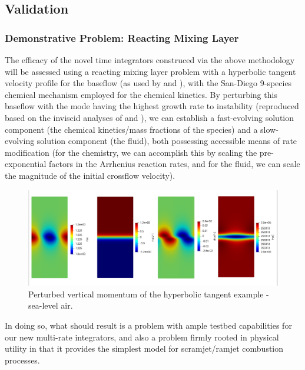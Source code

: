 \subsection{Validation}

\subsubsection{Demonstrative Problem: Reacting Mixing Layer}

The efficacy of the novel time integrators construced via the above methodology will
be assessed using a reacting mixing layer problem with a hyperbolic tangent velocity profile
for the baseflow (as used by \cite{michalke1964inviscid} and \cite{blumen1970shear}), with
the San-Diego 9-species chemical mechanism employed for the chemical kinetics. By perturbing
this baseflow with the mode having the highest growth rate to instability (reproduced based
on the inviscid analyses of \cite{michalke1964inviscid} and \cite{blumen1970shear}), we can
establish a fast-evolving solution component (the chemical kinetics/mass fractions of the
species) and a slow-evolving solution component (the fluid), both possessing accessible
means of rate modification (for the chemistry, we can accomplish this by scaling the
pre-exponential factors in the Arrhenius reaction rates, and for the fluid, we can scale
the magnitude of the initial crossflow velocity).

\begin{figure}
\centering
\includegraphics[width=0.9\linewidth,trim=4 4 4 4,clip]{figures/hyperbolic_tangent_air.png}
\caption{Perturbed vertical momentum of the hyperbolic tangent example - sea-level air.}
\label{fig:hyperbolic_cold_rhov2}
\end{figure}

In doing so, what should result is a problem with ample testbed capabilities for our
new multi-rate integrators, and also a problem firmly rooted in physical utility in that
it provides the simplest model for scramjet/ramjet combustion processes.

